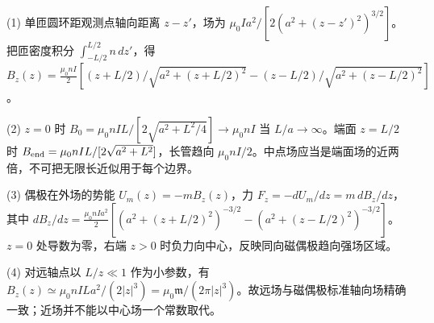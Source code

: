 (1) 单匝圆环距观测点轴向距离 \(z-z'\)，场为 \(\mu_0Ia^2/[2(a^2+(z-z')^2)^{3/2}]\)。把匝密度积分 \(\int_{-L/2}^{L/2}n\,dz'\)，得 \(B_z(z)=\frac{\mu_0nI}{2}[(z+L/2)/\sqrt{a^2+(z+L/2)^2}-(z-L/2)/\sqrt{a^2+(z-L/2)^2}]\)。

(2) \(z=0\) 时 \(B_0=\mu_0nIL/[2\sqrt{a^2+L^2/4}]\to\mu_0nI\) 当 \(L/a\to\infty\)。端面 \(z=L/2\) 时 \(B_{\rm end}=\mu_0nIL/[2\sqrt{a^2+L^2}]\)，长管趋向 \(\mu_0nI/2\)。中点场应当是端面场的近两倍，不可把无限长近似用于每个边界。

(3) 偶极在外场的势能 \(U_m(z)=-mB_z(z)\)，力 \(F_z=-dU_m/dz=m\,dB_z/dz\)，其中 \(dB_z/dz=\frac{\mu_0nIa^2}{2}[(a^2+(z+L/2)^2)^{-3/2}-(a^2+(z-L/2)^2)^{-3/2}]\)。\(z=0\) 处导数为零，右端 \(z>0\) 时负力向中心，反映同向磁偶极趋向强场区域。

(4) 对远轴点以 \(L/z\ll1\) 作为小参数，有 \(B_z(z)\simeq\mu_0nILa^2/(2|z|^3)=\mu_0\mathfrak m/(2\pi|z|^3)\)。故远场与磁偶极标准轴向场精确一致；近场并不能以中心场一个常数取代。
